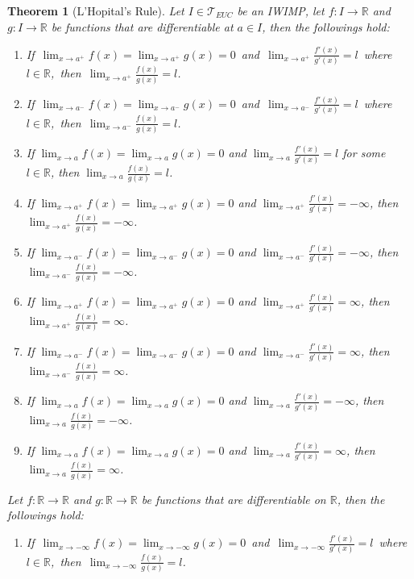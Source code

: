 \documentclass[11pt]{article}
\theoremstyle{break}
\theoremstyle{break}
\newtheorem{thm}{Theorem}[section]
\newcommand{\R}{\mathbb{R}}
\newcommand{\T}{\mathcal{T}}
\begin{document}
	\begin{thm}[L'Hopital's Rule]
		Let $I \in \T_{EUC}$ be an IWIMP, let $f:I \to \R$ and $g:I \to \R$ be functions that are differentiable at $a \in I$, then the followings hold:
		\begin{enumerate}[topsep=3pt,itemsep=-1ex,partopsep=1ex,parsep=1ex]
			\item \mbox{If $\lim_{x \to a^+}f(x) = \lim_{x \to a^+} g(x) =0$ and $\lim_{x \to a^+} \frac{f'(x)}{g'(x)}=l$ where $l \in \R$, then $\lim_{x \to a^+}\frac{f(x)}{g(x)}=l$}.
			\item \mbox{If $\lim_{x \to a^-}f(x) = \lim_{x \to a^-} g(x) =0$ and $\lim_{x \to a^-} \frac{f'(x)}{g'(x)}=l$ where $l \in \R$, then $\lim_{x \to a^-}\frac{f(x)}{g(x)}=l$}.
			\item If $\lim_{x \to a}f(x) = \lim_{x \to a} g(x) =0$ and $\lim_{x \to a} \frac{f'(x)}{g'(x)}=l$ for some $l \in \R$, then $\lim_{x \to a}\frac{f(x)}{g(x)}=l$.
			\item If $\lim_{x \to a^+}f(x) = \lim_{x \to a^+} g(x) =0$ and $\lim_{x \to a^+} \frac{f'(x)}{g'(x)}=-\infty$, then $\lim_{x \to a^+}\frac{f(x)}{g(x)}=-\infty$.
			\item If $\lim_{x \to a^-}f(x) = \lim_{x \to a^-} g(x) =0$ and $\lim_{x \to a^-} \frac{f'(x)}{g'(x)}=-\infty$, then $\lim_{x \to a^-}\frac{f(x)}{g(x)}=-\infty$.
			\item If $\lim_{x \to a^+}f(x) = \lim_{x \to a^+} g(x) =0$ and $\lim_{x \to a^+} \frac{f'(x)}{g'(x)}=\infty$, then $\lim_{x \to a^+}\frac{f(x)}{g(x)}=\infty$.
			\item If $\lim_{x \to a^-}f(x) = \lim_{x \to a^-} g(x) =0$ and $\lim_{x \to a^-} \frac{f'(x)}{g'(x)}=\infty$, then $\lim_{x \to a^-}\frac{f(x)}{g(x)}=\infty$.
			\item If $\lim_{x \to a}f(x) = \lim_{x \to a} g(x) =0$ and $\lim_{x \to a} \frac{f'(x)}{g'(x)}=-\infty$, then $\lim_{x \to a}\frac{f(x)}{g(x)}=-\infty$.
			\item If $\lim_{x \to a}f(x) = \lim_{x \to a} g(x) =0$ and $\lim_{x \to a} \frac{f'(x)}{g'(x)}=\infty$, then $\lim_{x \to a}\frac{f(x)}{g(x)}=\infty$.
		\end{enumerate}	
	\hfill\break
		Let $f:\R \to \R$ and $g:\R \to \R$ be functions that are differentiable on $\R$, then the followings hold:
		\begin{enumerate}[topsep=3pt,itemsep=-1ex,partopsep=1ex,parsep=1ex]
			\item \mbox{If $\lim_{x \to -\infty}f(x) = \lim_{x \to -\infty} g(x) =0$ and $\lim_{x \to -\infty} \frac{f'(x)}{g'(x)}=l$ where $l \in \R$, then $\lim_{x \to -\infty}\frac{f(x)}{g(x)}=l$}.

\end{enumerate}
\end{thm}
\end{document}
